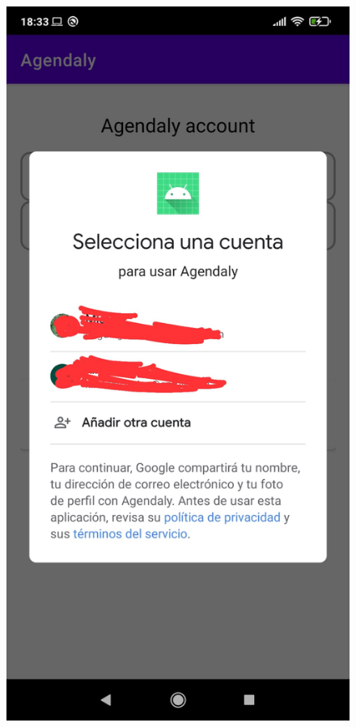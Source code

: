 \documentclass[a4paper,openright,12pt]{article}
\begin{document}
\begin{figure}
            \includegraphics[scale=0.05]{google.jpeg} \hfill

\end{figure}
\end{document}
